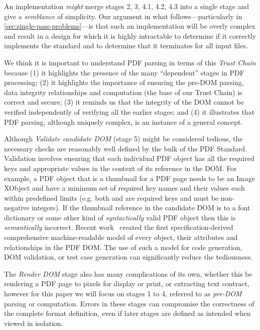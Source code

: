 An implementation \emph{might} merge stages 2, 3, 4.1, 4.2, 4.3 into
a single stage and give a \emph{semblance} of simplicity.
%
Our argument in what follows---particularly in
\cref{sec:single-pass-problems}---is
that such an implementation will be overly
complex and result in a design for which it is highly intractable
to determine if it correctly implements the standard
and to determine that it terminates for all input files.

We think it is important to understand PDF parsing in terms of this
\emph{Trust Chain} because
%
(1) it highlights the presence of the many ``dependent'' stages
in PDF processing;
%
(2) it highlights the importance of ensuring the pre-DOM parsing, data integrity relationships and
computation (the base of our Trust Chain) is correct and secure;
%
(3) it reminds us that the integrity of the DOM cannot be verified
independently of verifying all the earlier stages; and
%
(4) it illustrates that PDF parsing, although uniquely complex, is an instance of
a general concept.

Although \emph{Validate candidate DOM} (stage 5) might be considered tedious, the necessary checks are 
reasonably well defined by the bulk of the PDF Standard. Validation involves ensuring that each 
individual PDF object has all the required keys and appropriate values in the context of its reference in the DOM.
For example, a PDF object that is a thumbnail for a PDF page needs to be an Image XObject and have a 
minimum set of required key names and their values each within predefined limits (e.g. both
 and  are required keys and must be non-negative integers). If the 
thumbnail reference in the candidate DOM is to a font dictionary or some other kind of
\emph{syntactically} valid PDF object then this is \emph{semantically} incorrect. Recent work~
\cite{peterwyattArlingtonPDFModel2021} created the first specification-derived comprehensive
machine-readable model of every object, their attributes and relationships in the PDF DOM. The use
of such a model for code generation, DOM validation, or test case generation can significantly reduce the tediousness.

The \emph{Render DOM} stage also has many complications of its own, whether this be rendering a PDF
page to pixels for display or print, or extracting text contract, however for this paper we will
focus on stages 1 to 4, referred to as \emph{pre-DOM} parsing or computation.
%
Errors in these stages can compromise the correctness of the complete format definition, even if later stages are defined as intended when viewed in isolation.
